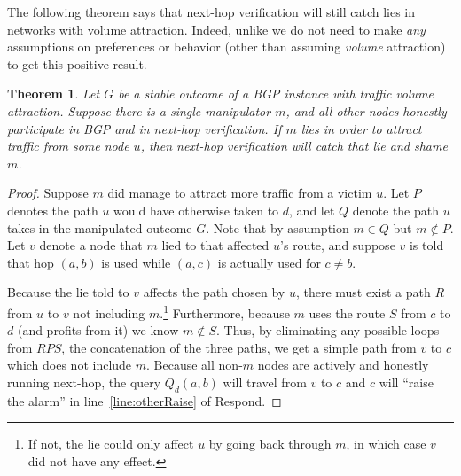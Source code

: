 \documentclass[10pt]{article}
\newtheorem{theorem}{Theorem}
\begin{document}
  The following theorem says that next-hop verification will still catch lies
  in networks with volume attraction.
  Indeed, unlike \cite{Attraction} we do not need to make \emph{any} assumptions
  on preferences or behavior (other than assuming \emph{volume} attraction)
  to get this positive result.
  \begin{theorem}
    Let $G$ be a stable outcome of a BGP instance with traffic volume attraction.
    Suppose there is a single manipulator $m$,
    and all other nodes honestly participate in BGP and in next-hop verification.
    If $m$ lies in order to attract traffic from some node $u$,
    then next-hop verification will catch that lie and shame $m$.
  \end{theorem}
  \begin{proof}
    Suppose $m$ did manage to attract more traffic from a victim $u$.
    Let $P$ denotes the path $u$ would have otherwise taken to $d$,
    and let $Q$ denote the path $u$ takes in the manipulated outcome $G$.
    Note that by assumption $m\in Q$ but $m\notin P$.
    Let $v$ denote a node that $m$ lied to that affected $u$'s route, and suppose $v$ is told
    that hop $(a,b)$ is used while $(a,c)$ is actually used for $c\ne b$.

    Because the lie told to $v$ affects the path chosen by $u$,
    there must exist a path $R$ from $u$ to $v$ not including $m$.\footnote{If not, the lie could only affect $u$ by going back through $m$, in which case $v$ did not have any effect.}
    Furthermore, because $m$ uses the route $S$ from $c$ to $d$
    (and profits from it) we know $m\notin S$.
    Thus, by eliminating any possible loops from $RPS$,
    the concatenation of the three paths,
    we get a simple path from $v$ to $c$ which does not include $m$.
    Because all non-$m$ nodes are actively and honestly running next-hop,
    the query $Q_d(a,b)$ will travel from $v$ to $c$ and $c$ will
    ``raise the alarm'' in line~\ref{line:otherRaise} of {\sc
    Respond}.
  \end{proof}
\end{document}
